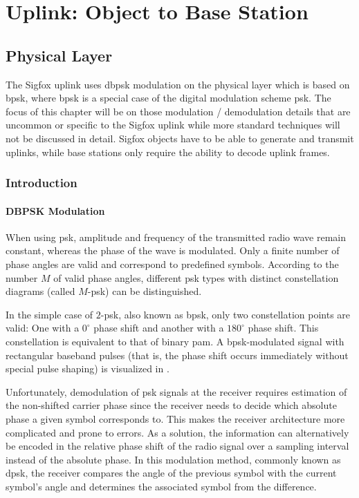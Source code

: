 \chapter{Uplink: Object to Base Station}
\label{sec:uplink}
\FloatBarrier
\section{Physical Layer}
The Sigfox uplink uses \gls{dbpsk} modulation on the physical layer which is based on \gls{bpsk}, where \gls{bpsk} is a special case of the digital modulation scheme \gls{psk}.
The focus of this chapter will be on those modulation / demodulation details that are uncommon or specific to the Sigfox uplink while more standard techniques will not be discussed in detail.
Sigfox objects have to be able to generate and transmit uplinks, while base stations only require the ability to decode uplink frames.

\subsection{Introduction}
\subsubsection{DBPSK Modulation}
When using \gls{psk}, amplitude and frequency of the transmitted radio wave remain constant, whereas the phase of the wave is modulated.
Only a finite number of phase angles are valid and correspond to predefined symbols.
According to the number $M$ of valid phase angles, different \gls{psk} types with distinct constellation diagrams (called $M$-\gls{psk}) can be distinguished.

In the simple case of $2$-\gls{psk}, also known as \gls{bpsk}, only two constellation points are valid: One with a $0^\circ$ phase shift and another with a $180^\circ$ phase shift.
This constellation is equivalent to that of binary \gls{pam}.
A \gls{bpsk}-modulated signal with rectangular baseband pulses (that is, the phase shift occurs immediately without special pulse shaping) is visualized in .

Unfortunately, demodulation of \gls{psk} signals at the receiver requires estimation of the non-shifted carrier phase since the receiver needs to decide which absolute phase a given symbol corresponds to.
This makes the receiver architecture more complicated and prone to errors.
As a solution, the information can alternatively be encoded in the relative phase shift of the radio signal over a sampling interval instead of the absolute phase.
In this modulation method, commonly known as \gls{dpsk}, the receiver compares the angle of the previous symbol with the current symbol's angle and determines the associated symbol from the difference.


